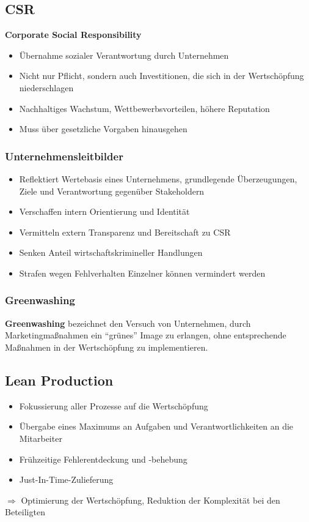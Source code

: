 \documentclass[titlepage,parskip=half]{scrartcl}
\begin{document}
\subsection{CSR}
\textbf{Corporate Social Responsibility}
\begin{itemize}
    \item Übernahme sozialer Verantwortung durch Unternehmen
    \item Nicht nur Pflicht, sondern auch Investitionen, die sich in der Wertschöpfung niederschlagen
    \item Nachhaltiges Wachstum, Wettbewerbsvorteilen, höhere Reputation
    \item Muss über gesetzliche Vorgaben hinausgehen
\end{itemize}

\subsubsection{Unternehmensleitbilder}
\begin{itemize}
    \item Reflektiert Wertebasis eines Unternehmens, grundlegende Überzeugungen, Ziele und Verantwortung gegenüber Stakeholdern
    \item Verschaffen intern Orientierung und Identität
    \item Vermitteln extern Transparenz und Bereitschaft zu CSR
    \item Senken Anteil wirtschaftskrimineller Handlungen
    \item Strafen wegen Fehlverhalten Einzelner können vermindert werden
\end{itemize}

\subsubsection{Greenwashing}
\textbf{Greenwashing} bezeichnet den Versuch von Unternehmen, durch Marketingmaßnahmen ein \enquote{grünes} Image zu erlangen, ohne entsprechende Maßnahmen in der Wertschöpfung zu implementieren.

\subsection{Lean Production}
\begin{itemize}
    \item Fokussierung aller Prozesse auf die Wertschöpfung
    \item Übergabe eines Maximums an Aufgaben und Verantwortlichkeiten an die Mitarbeiter
    \item Frühzeitige Fehlerentdeckung und -behebung
    \item Just-In-Time-Zulieferung
\end{itemize}
$\Rightarrow$ Optimierung der Wertschöpfung, Reduktion der Komplexität bei den Beteiligten
\end{document}
